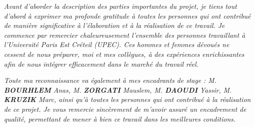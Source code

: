 \textit{
    Avant d'aborder la description des parties importantes du projet, je tiens tout d'abord à exprimer ma profonde gratitude à toutes les personnes qui ont contribué de manière significative à l'élaboration et à la réalisation de ce travail. Je commence par remercier chaleureusement l'ensemble des personnes travaillant à l'Université Paris Est Créteil (UPEC). Ces hommes et femmes dévoués ne cessent de nous préparer, moi et mes collègues, à des expériences enrichissantes afin de nous intégrer efficacement dans le marché du travail réel.}

\textit{
Toute ma reconnaissance va également à mes encadrants de stage : M. \textbf{BOURHLEM} Anas, M. \textbf{ZORGATI} Mauslem, M. \textbf{DAOUDI} Yassir, M. \textbf{KRUZIK} Marc, ainsi qu'à toutes les personnes qui ont contribué à la réalisation de ce projet. Je vous remercie sincèrement de m'avoir assuré un encadrement de qualité, permettant de mener à bien ce travail dans les meilleures conditions.
}
